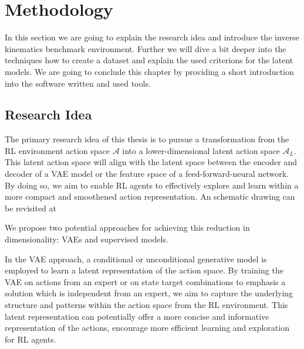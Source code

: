 \chapter{Methodology}\label{chap:Methodology}

In this section we are going to explain the research idea and introduce the inverse kinematics benchmark environment. Further we will dive a bit deeper into the techniques how to create a dataset and explain the used criterions for the latent models. We are going to conclude this chapter by providing a short introduction into the software written and used tools.

\section{Research Idea}

The primary research idea of this thesis is to pursue a transformation from the RL environment action space $\mathcal{A}$ into a lower-dimensional latent action space $\mathcal{A}_L$. This latent action space will align with the latent space between the encoder and decoder of a VAE model or the feature space of a feed-forward-neural network. By doing so, we aim to enable RL agents to effectively explore and learn within a more compact and smoothened action representation. An schematic drawing can be revisited at 

We propose two potential approaches for achieving this reduction in dimensionality: VAEs and supervised models.

In the VAE approach, a conditional or unconditional generative model is employed to learn a latent representation of the action space. By training the VAE on actions from an expert or on state target combinations to emphasis a solution which is independent from an expert, we aim to capture the underlying structure and patterns within the action space from the RL environment. This latent representation can potentially offer a more concise and informative representation of the actions, encourage more efficient learning and exploration for RL agents.

